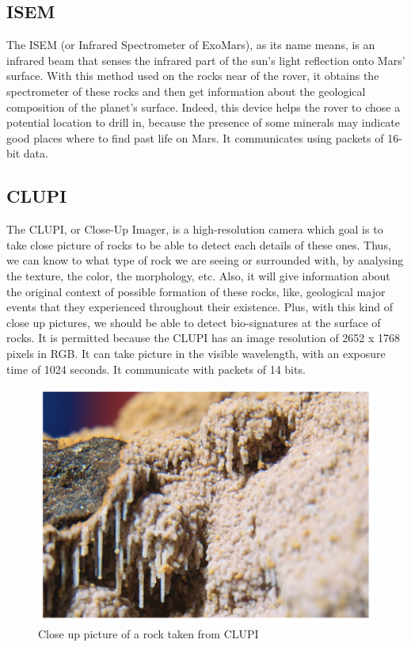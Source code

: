 \documentclass[12pt,a4paper]{article}
\begin{document}
\subsection{ISEM}

The ISEM (or Infrared Spectrometer of ExoMars), as its name means, is an infrared beam that senses the infrared part of the sun's light reflection onto Mars' surface. With this method used on the rocks near of the rover, it obtains the spectrometer of these rocks and then get information about the geological composition of the planet's surface. Indeed, this device helps the rover to chose a potential location to drill in, because the presence of some minerals may indicate good places where to find past life on Mars. It communicates using packets of 16-bit data.

\subsection{CLUPI}

The CLUPI, or Close-Up Imager, is a high-resolution camera which goal is to take close picture of rocks to be able to detect each details of these ones. Thus, we can know to what type of rock we are seeing or surrounded with, by analysing the texture, the color, the morphology, etc. Also, it will give information about the original context of possible formation of these rocks, like, geological major events that they experienced throughout their existence. Plus, with this kind of close up pictures, we should be able to detect bio-signatures at the surface of rocks. It is permitted because the CLUPI has an image resolution of 2652 x 1768 pixels in RGB. It can take picture in the visible wavelength, with an exposure time of 1024 seconds. It communicate with packets of 14 bits.

\begin{figure}[h]
	\centering
    \includegraphics[scale = 0.5]{pictures/close_up_image.png}
    \caption{Close up picture of a rock taken from CLUPI}
\end{figure}
\end{document}
